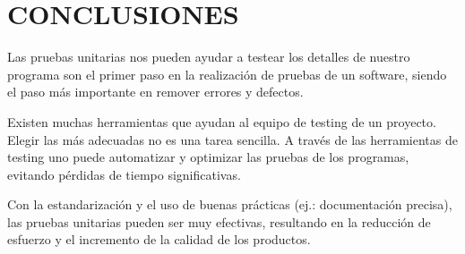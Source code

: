 \section{CONCLUSIONES}
 Las pruebas unitarias nos pueden ayudar a testear los detalles de nuestro programa son el primer paso en la realización de pruebas de un software, siendo el paso más importante en remover errores y defectos.

 Existen muchas herramientas que ayudan al equipo de testing de un proyecto. Elegir las más adecuadas no es una tarea sencilla.
A través de las herramientas de testing uno puede automatizar y optimizar las pruebas de los programas, evitando pérdidas de tiempo significativas.

Con la estandarización y el uso de buenas prácticas (ej.: documentación precisa), las pruebas unitarias pueden ser muy efectivas, resultando en la reducción de esfuerzo y el incremento de la calidad de los productos. 

